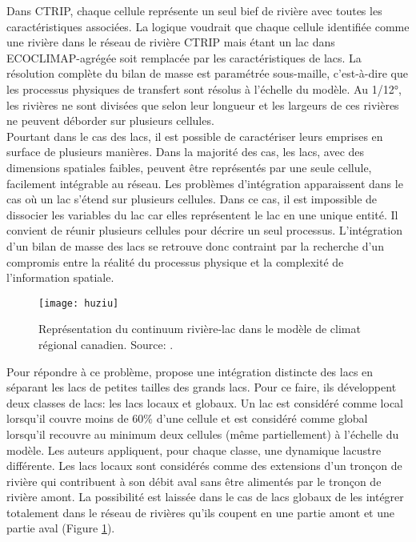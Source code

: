 Dans CTRIP, chaque cellule représente un seul bief de rivière avec toutes les caractéristiques associées. La logique voudrait que chaque cellule identifiée comme une rivière dans le réseau de rivière CTRIP mais étant un lac dans ECOCLIMAP-agrégée soit remplacée par les caractéristiques de lacs. La résolution complète du bilan de masse est paramétrée sous-maille, c'est-à-dire que les processus physiques de transfert sont résolus à l'échelle du modèle. Au 1/12°, les rivières ne sont divisées que selon leur longueur et les largeurs de ces rivières ne peuvent déborder sur plusieurs cellules. \\
Pourtant dans le cas des lacs, il est possible de caractériser leurs emprises en surface de plusieurs manières. Dans la majorité des cas, les lacs, avec des dimensions spatiales faibles, peuvent être représentés par une seule cellule, facilement intégrable au réseau. Les problèmes d'intégration apparaissent dans le cas où un lac s'étend sur plusieurs cellules. Dans ce cas, il est impossible de dissocier les variables du lac car elles représentent le lac en une unique entité. Il convient de réunir plusieurs cellules pour décrire un seul processus. L'intégration d'un bilan de masse des lacs se retrouve donc contraint par la recherche d'un compromis entre la réalité du processus physique et la complexité de l'information spatiale. \\

\begin{figure}[h!]
  \centering
  \texttt{[image: huziu]}
  \caption{Représentation du continuum rivière-lac dans le modèle de climat régional canadien. Source: \citet{huziy2017}.}
  \label{huziu}
\end{figure}

Pour répondre à ce problème, \citet{huziy2017} propose une intégration distincte des lacs en séparant les lacs de petites tailles des grands lacs. Pour ce faire, ils développent deux classes de lacs: les lacs locaux et globaux. Un lac est considéré comme local lorsqu'il couvre moins de 60\% d'une cellule et est considéré comme global lorsqu'il recouvre au minimum deux cellules (même partiellement) à l'échelle du modèle. Les auteurs appliquent, pour chaque classe, une dynamique lacustre différente. Les lacs locaux sont considérés comme des extensions d'un tronçon de rivière qui contribuent à son débit aval sans être alimentés par le tronçon de rivière amont. La possibilité est laissée dans le cas de lacs globaux de les intégrer totalement dans le réseau de rivières qu'ils coupent en une partie amont et une partie aval (Figure \ref{huziu}). \\


